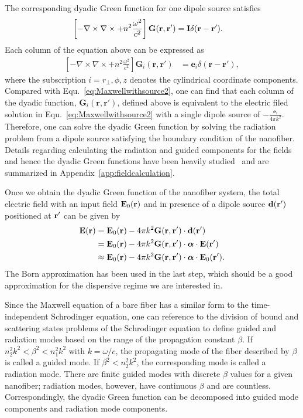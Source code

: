 \documentclass[preprint,aps,pra,onecolumn]{revtex4-1} %
\begin{document}
The corresponding dyadic Green function for one dipole source satisfies
\begin{align}
\left[ -\nabla\times\nabla\times + n^2\frac{\omega^2}{c^2} \right] \mathbf{G}(\mathbf{r},\mathbf{r}') &= \mathbf{I}\delta(\mathbf{r}-\mathbf{r}'). 
\end{align}
Each column of the equation above can be expressed as
\begin{align}\label{eq:GFcolumneq}
\left[ -\nabla\times\nabla\times + n^2\frac{\omega^2}{c^2} \right] \mathbf{G}_i(\mathbf{r},\mathbf{r}') &= \mathbf{e}_i\delta(\mathbf{r}-\mathbf{r}'), 
\end{align}
where the subscription $ i=r\!_\perp,\phi,z $ denotes the cylindrical coordinate components. Compared with Equ.~\eqref{eq:Maxwellwithsource2}, one can find that each column of the dyadic function, $\mathbf{G}_i(\mathbf{r},\mathbf{r}')$, defined above is equivalent to the electric filed solution in Equ.~\eqref{eq:Maxwellwithsource2} with a single dipole source of $-\frac{\mathbf{e}_i}{4\pi k^2}$. Therefore, one can solve the dyadic Green function by solving the radiation problem from a dipole source satisfying the boundary condition of the nanofiber. Details regarding calculating the radiation and guided components for the fields and hence the dyadic Green functions have been heavily studied~\cite{Klimov2004,Nha1997,Maslov2006} and are summarized in Appendix~\ref{app:fieldcalculation}.

Once we obtain the dyadic Green function of the nanofiber system, the total electric field with an input field $\mathbf{E}_0(\mathbf{r})$ and in presence of a dipole source $\mathbf{d}(\mathbf{r}')$ positioned at $\mathbf{r}'$ can be given by
\begin{align}
\mathbf{E}(\mathbf{r}) &= \mathbf{E}_0(\mathbf{r})-4\pi k^2\mathbf{G}(\mathbf{r},\mathbf{r}')\cdot \mathbf{d}(\mathbf{r}')\\
&=\mathbf{E}_0(\mathbf{r})-4\pi k^2 \mathbf{G}(\mathbf{r},\mathbf{r}')\cdot \boldsymbol{\alpha}\cdot \mathbf{E}(\mathbf{r}')\\
&\approx \mathbf{E}_0(\mathbf{r})-4\pi k^2 \mathbf{G}(\mathbf{r},\mathbf{r}')\cdot \boldsymbol{\alpha}\cdot \mathbf{E}_0(\mathbf{r}').
\end{align}
The Born approximation has been used in the last step, which should be a good approximation for the dispersive regime we are interested in. 

Since the Maxwell equation of a bare fiber has a similar form to the time-independent Schrodinger equation, one can reference to the division of bound and scattering states problems of the Schrodinger equation to define guided and radiation modes based on the range of the propagation constant $ \beta $. If $ n_2^2k^2<\beta^2<n_1^2k^2 $ with $ k=\omega/c $, the propagating mode of the fiber described by $ \beta $ is called a guided mode. If $ \beta^2<n_2^2k^2 $, the corresponding mode is called a radiation mode. There are finite guided modes with discrete $ \beta $ values for a given nanofiber; radiation modes, however, have continuous $ \beta $ and are countless. Correspondingly, the dyadic Green function can be decomposed into guided mode components and radiation mode components.    
\end{document}
